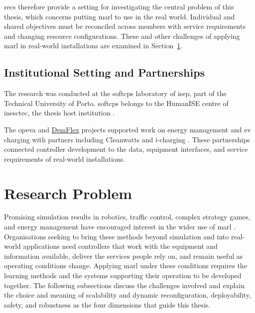 \glspl{rec} therefore provide a setting for investigating the central problem of this thesis, which concerns putting \gls{marl} to use in the real world. Individual and shared objectives must be reconciled across members with service requirements and changing resource configurations. These and other challenges of applying \gls{marl} in real-world installations are examined in Section~\ref{sec:intro-problem}.

\subsection{Institutional Setting and Partnerships}
\label{sec:intro-research-context}

The research was conducted at the \gls{softcps} laboratory of \gls{isep}, part of the Technical University of Porto. \gls{softcps} belongs to the HumanISE centre of \gls{inesctec}, the thesis host institution \parencite{softcpslaboratory}.

The \gls{opeva} and \href{https://www2.isep.ipp.pt/softcps/?p=1235}{DemFlex} projects supported work on energy management and \gls{ev} charging with partners including Cleanwatts and i-charging \parencite{fonseca2025realworldrec,softcps2026demflex}. These partnerships connected controller development to the data, equipment interfaces, and service requirements of real-world installations.

\section{Research Problem}
\label{sec:intro-problem}
\label{sec:intro-problem-statement}

Promising simulation results in robotics, traffic control, complex strategy games, and energy management have encouraged interest in the wider use of \gls{marl} \parencite{gronauer2022survey,orr2023multirobot,keren2024energynetworks}. Organisations seeking to bring these methods beyond simulation and into real-world applications need controllers that work with the equipment and information available, deliver the services people rely on, and remain useful as operating conditions change. Applying \gls{marl} under these conditions requires the learning methods and the systems supporting their operation to be developed together. The following subsections discuss the challenges involved and explain the choice and meaning of scalability and dynamic reconfiguration, deployability, safety, and robustness as the four dimensions that guide this thesis.

